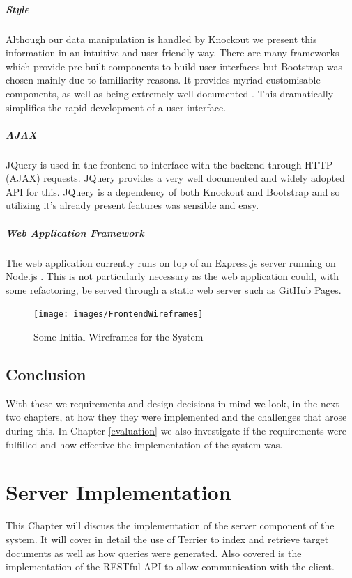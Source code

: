 \documentclass{l4proj}
\begin{document}
\paragraph{Style}
Although our data manipulation is handled by Knockout we present this information in an intuitive and user friendly way. There are many frameworks which provide pre-built components to build user interfaces but Bootstrap was chosen mainly due to familiarity reasons. It provides myriad customisable components, as well as being extremely well documented \cite{bootstrap}. This dramatically simplifies the rapid development of a user interface.

\paragraph{AJAX}
JQuery is used in the frontend to interface with the backend through HTTP (AJAX) requests. JQuery provides a very well documented and widely adopted API for this. JQuery is a dependency of both Knockout and Bootstrap and so utilizing it's already present features was sensible and easy.

\paragraph{Web Application Framework}
The web application currently runs on top of an Express.js server running on Node.js \cite{express} \cite{node}. This is not particularly necessary as the web application could, with some refactoring, be served through a static web server such as GitHub Pages.
\begin{figure}[H]
\centering
\texttt{[image: images/FrontendWireframes]}
\caption{Some Initial Wireframes for the System}
\label{wireframes}
\end{figure}

\section{Conclusion}
With these we requirements and design decisions in mind we look, in the next two chapters, at how they they were implemented and the challenges that arose during this. In Chapter \ref{evaluation} we also investigate if the requirements were fulfilled and how effective the implementation of the system was.

\chapter{Server Implementation} \label{serverimplementation}
This Chapter will discuss the implementation of the server component of the system. It will cover in detail the use of Terrier to index and retrieve target documents as well as how queries were generated. Also covered is the implementation of the RESTful API to allow communication with the client.
\end{document}
